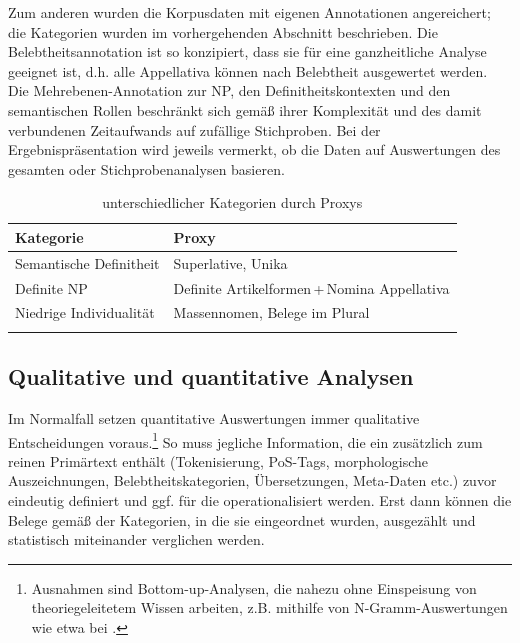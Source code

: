 Zum anderen wurden die Korpusdaten mit eigenen Annotationen  angereichert; die Kategorien wurden im vorhergehenden Abschnitt beschrieben. Die Belebtheitsannotation  ist so konzipiert, dass sie für eine ganzheitliche Analyse geeignet ist, d.h. alle Appellativa können nach Belebtheit ausgewertet werden. Die Mehrebenen-Annotation  zur  NP, den Definitheitskontexten  und den semantischen Rollen beschränkt sich gemäß ihrer Komplexität und des damit verbundenen Zeitaufwands auf zufällige Stichproben. Bei der Ergebnispräsentation wird jeweils vermerkt, ob die Daten auf Auswertungen des gesamten  oder Stichprobenanalysen basieren. 

\begin{table}
\centering
\begin{tabular}{ll}
\lsptoprule
Kategorie     & Proxy            \\ \midrule
Semantische Definitheit & Superlative, Unika            \\
Definite NP             & Definite Artikelformen\,+\,Nomina Appellativa        \\
Niedrige Individualität & Massennomen, Belege im Plural \\ \lspbottomrule
\end{tabular}
\caption{ unterschiedlicher Kategorien durch Proxys\label{tab:proxys}}
\end{table}
 
\subsection{Qualitative und quantitative Analysen}\label{sec:qual-quant}

Im Normalfall setzen quantitative Auswertungen immer qualitative Entscheidungen voraus.\footnote{Ausnahmen sind Bottom-up-Analysen, die nahezu ohne Einspeisung von theoriegeleitetem Wissen arbeiten, z.B. mithilfe von N-Gramm-Auswertungen wie etwa bei \textcite{Scharloth2012}.} So muss jegliche Information, die ein  zusätzlich zum reinen Primärtext enthält  (Tokenisierung, PoS-Tags, morphologische Auszeichnungen, Belebtheitskategorien, Übersetzungen, Meta-Daten etc.) zuvor eindeutig definiert und ggf. für die  operationalisiert  werden. Erst dann können die Belege gemäß der Kategorien, in die sie eingeordnet wurden, ausgezählt und statistisch miteinander verglichen werden.   

